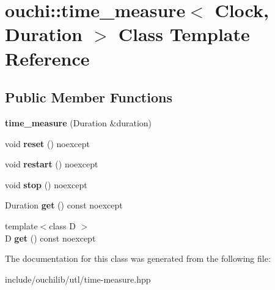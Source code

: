 \hypertarget{classouchi_1_1time__measure}{}\section{ouchi\+::time\+\_\+measure$<$ Clock, Duration $>$ Class Template Reference}
\label{classouchi_1_1time__measure}
\subsection*{Public Member Functions}
\begin{DoxyCompactItemize}
\item 
\mbox{\label{classouchi_1_1time__measure_a41c1f1fd0f401215b96c3f72d18f3a15}} 
{\bfseries time\+\_\+measure} (Duration \&duration)
\item 
\mbox{\label{classouchi_1_1time__measure_a97a0b0a8f5e3a57eee777688fefa55d3}} 
void {\bfseries reset} () noexcept
\item 
\mbox{\label{classouchi_1_1time__measure_a5ed89ec25a5a89d60ca34d79dfa9b950}} 
void {\bfseries restart} () noexcept
\item 
\mbox{\label{classouchi_1_1time__measure_ab0595e4cbc95a3d8725e5f173d8f5d67}} 
void {\bfseries stop} () noexcept
\item 
\mbox{\label{classouchi_1_1time__measure_adf69ed8ef525d67aaaa7fcc388702c9f}} 
Duration {\bfseries get} () const noexcept
\item 
\mbox{\label{classouchi_1_1time__measure_ad8f3dd2414a7a7a6af7783069d82d29c}} 
{\footnotesize template$<$class D $>$ }\\D {\bfseries get} () const noexcept
\end{DoxyCompactItemize}


The documentation for this class was generated from the following file\+:\begin{DoxyCompactItemize}
\item 
include/ouchilib/utl/time-\/measure.\+hpp\end{DoxyCompactItemize}
